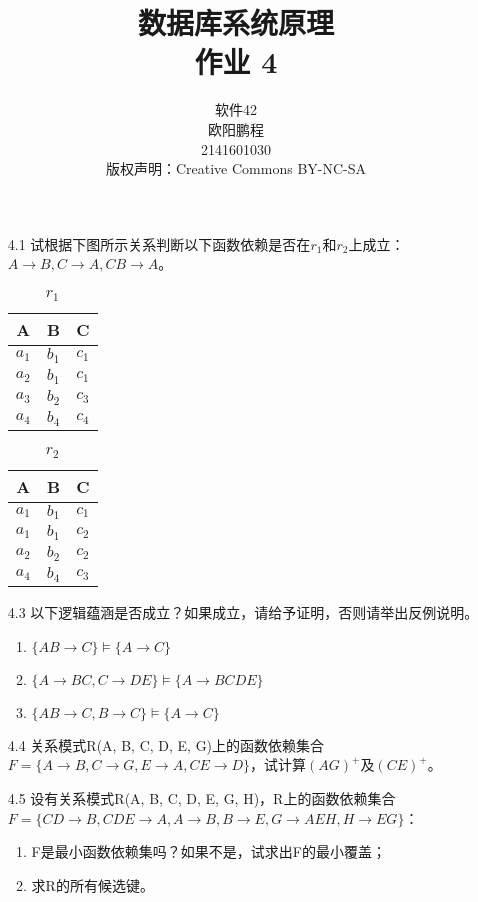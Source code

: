 \documentclass[]{ctexart}
\title{数据库系统原理 \\ 作业 4}
\author{软件42 \\ 欧阳鹏程 \\ 2141601030 \\ 版权声明：Creative Commons BY-NC-SA}
\begin{document}
\maketitle

\begin{enumerate}
	\item[4.1] 试根据下图所示关系判断以下函数依赖是否在$r_{1}$和$r_{2}$上成立：$A \to B, C \to A, CB \to A$。
	\begin{table}[H]
		\centering
		\caption{$r_{1}$}
		\begin{tabular}{|c|c|c|}
			\hline
			A & B & C \\\hline
			$a_{1}$ & $b_{1}$ & $c_{1}$ \\
			$a_{2}$ & $b_{1}$ & $c_{1}$ \\
			$a_{3}$ & $b_{2}$ & $c_{3}$ \\
			$a_{4}$ & $b_{4}$ & $c_{4}$ \\\hline
		\end{tabular}
	\end{table}

	\begin{table}[H]
		\centering
		\caption{$r_{2}$}
		\begin{tabular}{|c|c|c|}
			\hline
			A & B & C \\\hline
			$a_{1}$ & $b_{1}$ & $c_{1}$ \\
			$a_{1}$ & $b_{1}$ & $c_{2}$ \\
			$a_{2}$ & $b_{2}$ & $c_{2}$ \\
			$a_{4}$ & $b_{4}$ & $c_{3}$ \\\hline
		\end{tabular}
	\end{table}

	\item[4.3] 以下逻辑蕴涵是否成立？如果成立，请给予证明，否则请举出反例说明。
	\begin{enumerate}
		\item $\{AB \to C\} \vDash \{A \to C\}$
		\item $\{A \to BC, C\to DE\} \vDash \{A \to BCDE\}$
		\item $\{AB \to C, B \to C\} \vDash \{A \to C\}$
	\end{enumerate}

	\item[4.4] 关系模式R(A, B, C, D, E, G)上的函数依赖集合$F=\{A \to B, C \to G, E \to A, CE \to D\}$，试计算$(AG)^{+}$及$(CE)^{+}$。
	
	\item[4.5] 设有关系模式R(A, B, C, D, E, G, H)，R上的函数依赖集合$F=\{CD \to B, CDE \to A, A \to B, B \to E, G \to AEH, H \to EG\}$：
	\begin{enumerate}
		\item F是最小函数依赖集吗？如果不是，试求出F的最小覆盖；
		\item 求R的所有候选键。
	\end{enumerate}


\end{enumerate}
\end{document}

